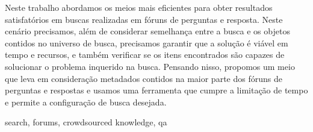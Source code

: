 Neste trabalho abordamos os meios mais eficientes para obter resultados satisfatórios em buscas realizadas em fóruns de perguntas e resposta. Neste cenário precisamos, além de considerar semelhança entre a busca e os objetos contidos no universo de busca, precisamos garantir que a solução é viável em tempo e recursos, e também verificar se os itens encontrados são capazes de solucionar o problema inquerido na busca. Pensando nisso, propomos um meio que leva em consideração metadados contidos na maior parte dos fóruns de perguntas e respostas e usamos uma ferramenta que cumpre a limitação de tempo e permite a configuração de busca desejada. 

\begin{keywords}
search, forums, crowdsourced knowledge, qa
\end{keywords}